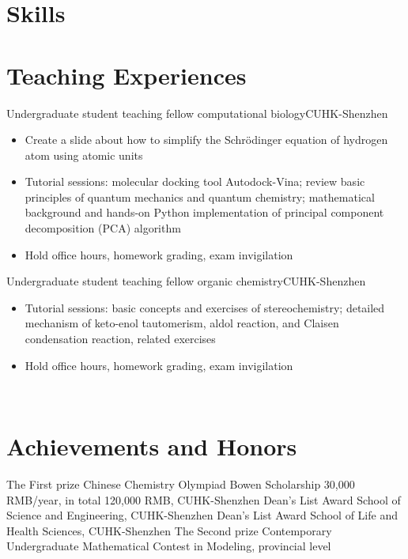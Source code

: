 \documentclass[12pt,a4paper,sans]{moderncv}
\newcommand\linksymbol{\scriptsize\faExternalLink*}
\newcommand{\cvsection}[1]{\section{{#1}}}
\begin{document}
\cvsection{Skills}


\cvsection{Teaching Experiences}
{Undergraduate student teaching fellow}{}
{computational biology}{CUHK-Shenzhen}
{
    \begin{itemize}[itemsep=2pt]
        \item Create a slide about how to simplify the Schrödinger equation of hydrogen atom using
        atomic units
        \item Tutorial sessions: molecular docking tool Autodock-Vina;
        review basic principles of quantum mechanics and quantum chemistry;
        mathematical background and hands-on Python implementation of principal component decomposition (PCA) algorithm
        \href{https://github.com/haoran0115/pca-implementation}{\linksymbol}
        \item Hold office hours, homework grading, exam invigilation
    \end{itemize}
}
\vspace{0.5em}
{Undergraduate student teaching fellow}{}
{organic chemistry}{CUHK-Shenzhen}
{
    \begin{itemize}[itemsep=2pt]
        \item Tutorial sessions: basic concepts and exercises of stereochemistry;
        detailed mechanism of keto-enol tautomerism, aldol reaction,
        and Claisen condensation reaction, related exercises
        \item Hold office hours, homework grading, exam invigilation
    \end{itemize}
}
\
\cvsection{Achievements and Honors}
{The First prize}{}
{Chinese Chemistry Olympiad}{}
{}
{Bowen Scholarship}{}
{30,000 RMB/year, in total 120,000 RMB, CUHK-Shenzhen}{}
{}
{Dean's List Award}{}
{School of Science and Engineering, CUHK-Shenzhen}{}
{}
{Dean's List Award}{}
{School of Life and Health Sciences, CUHK-Shenzhen}{}
{}
{The Second prize}{}
{Contemporary Undergraduate Mathematical Contest in Modeling, provincial level}{}
{}
\end{document}

